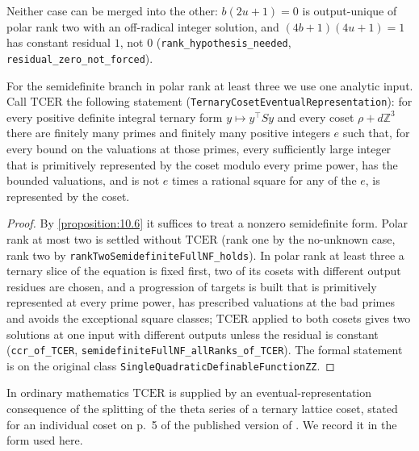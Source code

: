 Neither case can be merged into the other: $b(2u + 1) = 0$ is output-unique of polar rank two with an off-radical integer solution, and $(4b + 1)(4u + 1) = 1$ has constant residual $1$, not $0$ (\texttt{rank\_hypothesis\_needed}, \texttt{residual\_zero\_not\_forced}).

For the semidefinite branch in polar rank at least three we use one analytic input. Call $\mathrm{TCER}$ the following statement (\texttt{TernaryCosetEventualRepresentation}): for every positive definite integral ternary form $y ↦ y^{\top}Sy$ and every coset $ρ + dℤ^{3}$ there are finitely many primes and finitely many positive integers $e$ such that, for every bound on the valuations at those primes, every sufficiently large integer that is primitively represented by the coset modulo every prime power, has the bounded valuations, and is not $e$ times a rational square for any of the $e$, is represented by the coset.


\begin{proof}
By \cref{proposition:10.6} it suffices to treat a nonzero semidefinite form. Polar rank at most two is settled without $\mathrm{TCER}$ (rank one by the no-unknown case, rank two by \texttt{rankTwoSemidefiniteFullNF\_holds}). In polar rank at least three a ternary slice of the equation is fixed first, two of its cosets with different output residues are chosen, and a progression of targets is built that is primitively represented at every prime power, has prescribed valuations at the bad primes and avoids the exceptional square classes; $\mathrm{TCER}$ applied to both cosets gives two solutions at one input with different outputs unless the residual is constant (\texttt{ccr\_of\_TCER}, \texttt{semidefiniteFullNF\_allRanks\_of\_TCER}). The formal statement is on the original class \texttt{SingleQuadraticDefinableFunctionZZ}.
\end{proof}

In ordinary mathematics $\mathrm{TCER}$ is supplied by an eventual-representation consequence of the splitting of the theta series of a ternary lattice coset, stated for an individual coset on p.~5 of the published version of \cite{KK26}. We record it in the form used here.

